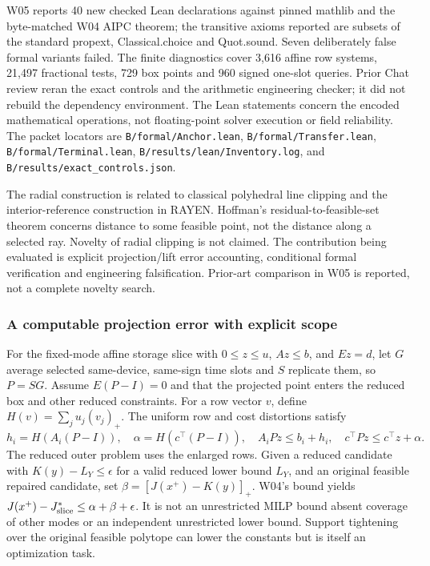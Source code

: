 \documentclass[11pt,letterpaper]{article}
\begin{document}
W05 reports 40 new checked Lean declarations against pinned mathlib and the byte-matched W04 AIPC theorem; the transitive axioms reported are subsets of the standard propext, Classical.choice and Quot.sound. Seven deliberately false formal variants failed. The finite diagnostics cover 3,616 affine row systems, 21,497 fractional tests, 729 box points and 960 signed one-slot queries. Prior Chat review reran the exact controls and the arithmetic engineering checker; it did not rebuild the dependency environment. The Lean statements concern the encoded mathematical operations, not floating-point solver execution or field reliability. The packet locators are \texttt{B/formal/Anchor.lean}, \texttt{B/formal/Transfer.lean}, \texttt{B/formal/Terminal.lean}, \texttt{B/results/lean/Inventory.log}, and \texttt{B/results/exact\_controls.json}.

The radial construction is related to classical polyhedral line clipping and the interior-reference construction in RAYEN. Hoffman's residual-to-feasible-set theorem concerns distance to some feasible point, not the distance along a selected ray.\cite{rayen,hoffman} Novelty of radial clipping is not claimed. The contribution being evaluated is explicit projection/lift error accounting, conditional formal verification and engineering falsification. Prior-art comparison in W05 is reported, not a complete novelty search.

\subsubsection{A computable projection error with explicit scope}
For the fixed-mode affine storage slice with $0\le z\le u$, $Az\le b$, and $Ez=d$, let $G$ average selected same-device, same-sign time slots and $S$ replicate them, so $P=SG$. Assume $E(P-I)=0$ and that the projected point enters the reduced box and other reduced constraints. For a row vector $v$, define $H(v)=\sum_j u_j(v_j)_+$. The uniform row and cost distortions satisfy
\[
 h_i=H(A_i(P-I)),\quad \alpha=H(c^\top(P-I)),\quad A_iPz\le b_i+h_i,
 \quad c^\top Pz\le c^\top z+\alpha.
\]
The reduced outer problem uses the enlarged rows. Given a reduced candidate with $K(y)-L_Y\le\epsilon$ for a valid reduced lower bound $L_Y$, and an original feasible repaired candidate, set $\beta=[J(x^+)-K(y)]_+$. W04's bound yields $J(x^+)-J^*_{\rm slice}\le\alpha+\beta+\epsilon$. It is not an unrestricted MILP bound absent coverage of other modes or an independent unrestricted lower bound. Support tightening over the original feasible polytope can lower the constants but is itself an optimization task.
\end{document}
